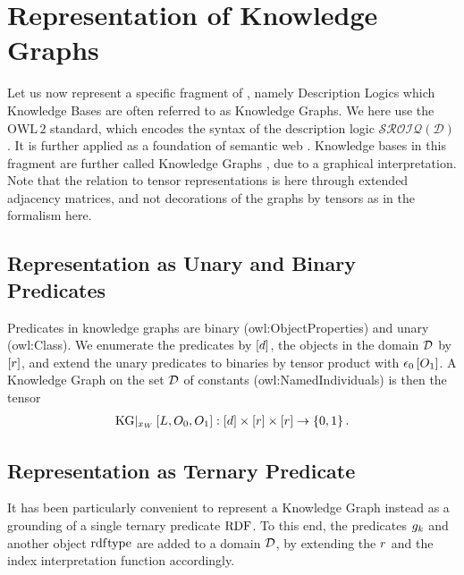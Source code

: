 \section{Representation of Knowledge Graphs}\label{sec:kgRepresentation}


Let us now represent a specific fragment of \firstOrderLogic{}, namely Description Logics which Knowledge Bases are often referred to as Knowledge Graphs.
We here use the $\mathrm{OWL\,2}$ standard, which encodes the syntax of the description logic $\mathcal{SROIQ(D)}$ \cite{rudolph_foundations_2011}.
It is further applied as a foundation of semantic web \cite{antoniou_semantic_2012}.
Knowledge bases in this fragment are further called Knowledge Graphs \cite{hogan_knowledge_2021}, due to a graphical interpretation.
%
Note that the relation to tensor representations is here through extended adjacency matrices, and not decorations of the graphs by tensors as in the formalism here.

\subsection{Representation as Unary and Binary Predicates}

Predicates in knowledge graphs are binary (owl:ObjectProperties) and unary (owl:Class).
We enumerate the predicates by $[d]$, the objects in the domain $\mathcal{D}$ by $[r]$, and extend the unary predicates to binaries by tensor product with $\epsilon_{0}\left[O_{1}\right]$.
A Knowledge Graph on the set $\mathcal{D}$ of constants (owl:NamedIndividuals) is then the tensor
\begin{align*}
    \mathrm{KG}|_{x_{W}}\left[L,O_{0},O_{1}\right] : [d] \times [r] \times [r] \rightarrow \{0,1\} \, .
\end{align*}


\subsection{Representation as Ternary Predicate}\label{subsec:knowledgeGraphTernaryRep}

It has been particularly convenient to represent a Knowledge Graph instead as a grounding of a single ternary predicate $\mathrm{RDF}$.
To this end, the predicates $g_{k}$ and another object $\mathrm{rdf}\mathrm{type}$ are added to a domain $\mathcal{D}$, by extending the $r$ and the index interpretation function accordingly.


